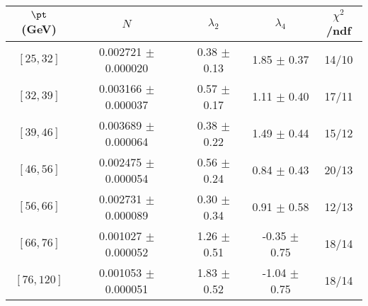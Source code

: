 \begin{tabular}{c||c|c|c|c}
$\pt$ (GeV) & $N$ & $\lambda_{2}$ & $\lambda_4$  & $\chi^2$/ndf  \\
\hline
$[25, 32]$ & 0.002721 $\pm$ 0.000020 & 0.38 $\pm$ 0.13 & 1.85 $\pm$ 0.37 & 14/10\\
$[32, 39]$ & 0.003166 $\pm$ 0.000037 & 0.57 $\pm$ 0.17 & 1.11 $\pm$ 0.40 & 17/11\\
$[39, 46]$ & 0.003689 $\pm$ 0.000064 & 0.38 $\pm$ 0.22 & 1.49 $\pm$ 0.44 & 15/12\\
$[46, 56]$ & 0.002475 $\pm$ 0.000054 & 0.56 $\pm$ 0.24 & 0.84 $\pm$ 0.43 & 20/13\\
$[56, 66]$ & 0.002731 $\pm$ 0.000089 & 0.30 $\pm$ 0.34 & 0.91 $\pm$ 0.58 & 12/13\\
$[66, 76]$ & 0.001027 $\pm$ 0.000052 & 1.26 $\pm$ 0.51 & -0.35 $\pm$ 0.75 & 18/14\\
$[76, 120]$ & 0.001053 $\pm$ 0.000051 & 1.83 $\pm$ 0.52 & -1.04 $\pm$ 0.75 & 18/14\\
\end{tabular}
